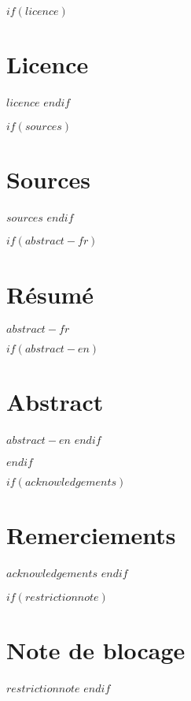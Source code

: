 \renewcommand{\contentsname}{Table des matières}
\renewcommand{\figurename}{Illustration}
\renewcommand{\listfigurename}{Table des figures}

$if(licence)$
\chapter*{Licence}
$licence$
$endif$

$if(sources)$
\chapter*{Sources}
$sources$
$endif$

$if(abstract-fr)$
\cleardoublepage
\begin{minipage}{\linewidth}

\chapter*{Résumé}
$abstract-fr$

$if(abstract-en)$
\chapter*{Abstract}
$abstract-en$
$endif$

\end{minipage}
\cleardoublepage
$endif$

$if(acknowledgements)$
\chapter*{Remerciements}
$acknowledgements$
$endif$

$if(restrictionnote)$
\chapter*{Note de blocage}
$restrictionnote$
$endif$

\cleardoublepage